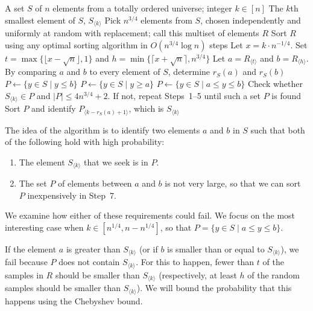 \documentclass[twoside,12pt]{book}
\theoremstyle{plain}
\theoremstyle{definition}
\theoremstyle{remark}
\begin{document}
\begin{algorithm}[H]
\caption{LazySelect}
\label{alg:lazy-select}
\begin{algorithmic}[1]
\Require A set $S$ of $n$ elements from a totally ordered universe; integer $k \in [n]$
\Ensure The $k$th smallest element of $S$, $S_{\langle k \rangle}$
\State Pick $n^{3/4}$ elements from $S$, chosen independently and uniformly at random with replacement; call this multiset of elements $R$
\State Sort $R$ using any optimal sorting algorithm in $O(n^{3/4} \log n)$ steps
\State Let $x = k \cdot n^{-1/4}$. Set $t = \max\{\lfloor x - \sqrt{n} \rfloor, 1\}$ and $h = \min\{\lceil x + \sqrt{n} \rceil, n^{3/4}\}$
\State Let $a = R_{\langle t \rangle}$ and $b = R_{\langle h \rangle}$. By comparing $a$ and $b$ to every element of $S$, determine $r_S(a)$ and $r_S(b)$
    \State $P \gets \{y \in S \mid y \leq b\}$
    \State $P \gets \{y \in S \mid y \geq a\}$
\Else
    \State $P \gets \{y \in S \mid a \leq y \leq b\}$
\EndIf
\State Check whether $S_{\langle k \rangle} \in P$ and $|P| \leq 4n^{3/4} + 2$. If not, repeat Steps~1--5 until such a set $P$ is found
\State Sort $P$ and identify $P_{\langle k - r_S(a) + 1 \rangle}$, which is $S_{\langle k \rangle}$
\end{algorithmic}
\end{algorithm}

The idea of the algorithm is to identify two elements $a$ and $b$ in $S$ such that both of the following hold with high probability:
\begin{enumerate}
\item The element $S_{\langle k \rangle}$ that we seek is in $P$.
\item The set $P$ of elements between $a$ and $b$ is not very large, so that we can sort $P$ inexpensively in Step~7.
\end{enumerate}

We examine how either of these requirements could fail. We focus on the most interesting case when $k \in [n^{1/4}, n - n^{1/4}]$, so that $P = \{y \in S \mid a \leq y \leq b\}$.

If the element $a$ is greater than $S_{\langle k \rangle}$ (or if $b$ is smaller than or equal to $S_{\langle k \rangle}$), we fail because $P$ does not contain $S_{\langle k \rangle}$. For this to happen, fewer than $t$ of the samples in $R$ should be smaller than $S_{\langle k \rangle}$ (respectively, at least $h$ of the random samples should be smaller than $S_{\langle k \rangle}$). We will bound the probability that this happens using the Chebyshev bound.
\end{document}
